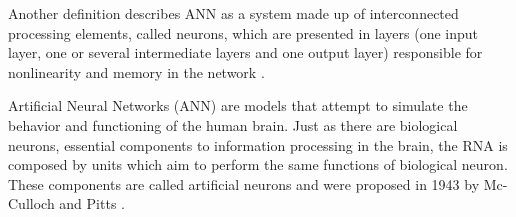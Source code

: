 Another definition describes ANN as a system made up of interconnected processing elements, called neurons, which are presented in layers (one input layer, one or several intermediate layers and one output layer) responsible for nonlinearity and memory in the network \cite{valenca2005aplicando}.

Artificial Neural Networks (ANN) are models that attempt to simulate the behavior and functioning of the human brain. Just as there are biological neurons, essential components to information processing in the brain, the RNA is composed by units which aim to perform the same functions of biological neuron. These components are called artificial neurons and were proposed in 1943 by Mc-Culloch and Pitts \cite{MCCULLOCKPITTS1943}.

